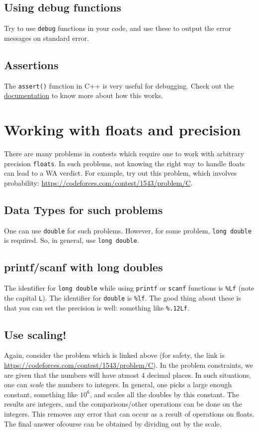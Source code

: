 \documentclass[12pt,a4paper]{amsart}
\numberwithin{equation}{section}
\theoremstyle{definition}
\begin{document}
\subsection{Using debug functions} Try to use \verb|debug| functions in your code, and use these to output the error messages on standard error. 

\subsection{Assertions} The \verb|assert()| function in C++ is very useful for debugging. Check out the \href{https://www.cplusplus.com/reference/cassert/assert/}{documentation} to know more about how this works.

\section{Working with floats and precision}

\noindent There are many problems in contests which require one to work with arbitrary precision \verb|floats|. In such problems, not knowing the right way to handle floats can lead to a WA verdict. For example, try out this problem, which involves probability: \url{https://codeforces.com/contest/1543/problem/C}. 

\subsection{Data Types for such problems} One can use \verb|double| for such problems. However, for some problem, \verb|long double| is required. So, in general, use \verb|long double|. 

\subsection{printf/scanf with long doubles} The identifier for \verb|long double| while using \verb|printf| or \verb|scanf| functions is \verb|%Lf| (note the capital \verb|L|). The identifier for \verb|double| is \verb|%lf|. The good thing about these is that you can set the precision is well: something like \verb|%.12Lf|. 

\subsection{Use scaling!} Again, consider the problem which is linked above (for safety, the link is \url{https://codeforces.com/contest/1543/problem/C}). In the problem constraints, we are given that the numbers will have atmost 4 decimal places. In such situations, one can \textit{scale} the numbers to integers. In general, one picks a large enough constant, something like $10^6$, and scales all the doubles by this constant. The results are integers, and the comparisons/other operations can be done on the integers. This removes any error that can occur as a result of operations on floats. The final answer ofcourse can be obtained by dividing out by the scale. 
\end{document}
